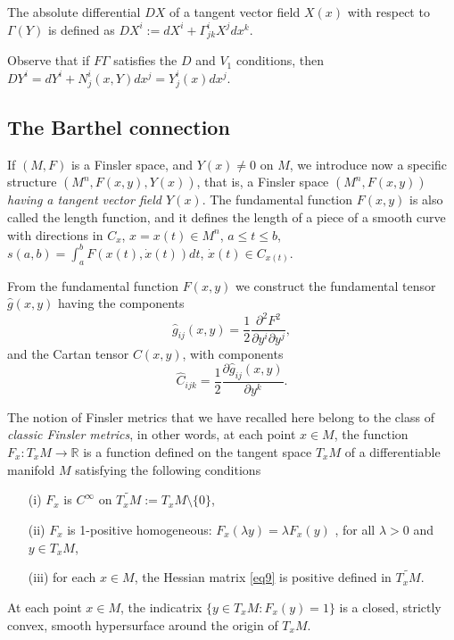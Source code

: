 \documentclass[aps,superscriptaddress, showpacs,preprintnumbers, superscriptaddress, nofootinbibt,twocolumn]{revtex4-2}
\begin{document}
The absolute differential $DX$ of a tangent vector field $X(x)$ with respect
to  $\Gamma (Y)$ is defined as  $DX^{i}:=dX^{i}+\Gamma _{jk}^{i}X^{j}dx^{k}$.

Observe that if $%
F\Gamma $ satisfies the $D$ and $V_{1}$ conditions, then $%
DY^{i}=dY^{i}+N_{j}^{i}\left( x,Y\right) dx^{j}=Y_{j}^{i}(x)dx^{j}$.

\subsection{The Barthel connection}

If $(M,F)$ is a Finsler space, and $Y(x)\neq 0$ on $M$,
we introduce now a specific  structure $(M^n,F(x,y),Y(x))$, that is, a Finsler space %
$(M^n,F(x,y))$ {\it having a tangent vector field $Y(x)$}.
The fundamental function {$F(x,y)$} is also called the length function, and it defines the
length of a piece of a smooth curve with directions in $C_{x}$, $x=x(t)\in
M^{n}$, $a\leq t\leq b$, $s\left( a,b\right) =\int_{a}^{b}F\left( x(t),\dot{x%
}\left( t\right) \right) dt$, $\dot{x}\left( t\right) \in C_{x(t)}$.

From the fundamental function $F(x,y)$ we construct the fundamental tensor $\hat{g%
}(x,y)$ having the components
\begin{equation}\label{eq9}
\hat{g}_{ij}(x,y)=\frac{1}{2}\frac{\partial ^{2}F^{2}}{\partial y^{i}\partial
y^{j}},
\end{equation}
and the Cartan tensor $C(x,y)$, with components
\begin{equation}
\hat{C}_{ijk}=\frac{1}{2}\frac{\partial \hat{g}_{ij}\left( x,y\right) }{\partial
{y}^{k}}.
\end{equation}

The notion of Finsler metrics that we have recalled here belong to the class
of \textit{classic Finsler metrics}, in other words, at each point $x\in M$,
the function $F_x:T_xM\to \mathbb{R} $ is a function defined on the tangent
space $T_xM$ of a differentiable manifold $M$ satisfying the following
conditions
{\it

\begin{enumerate}
\item[(i)] $F_x$ is $C^\infty$ on $\widetilde{T_xM}:=T_xM\setminus\{0\}$,

\item[(ii)] $F_x$ is 1-positive homogeneous: $F_x(\lambda y)=\lambda F_x(y)$%
, for all $\lambda>0$ and $y\in T_xM$,

\item[(iii)] for each $x\in M$, the Hessian matrix \eqref{eq9} is
positive defined in $\widetilde{T_xM}$.
\end{enumerate}
}
At each point $x\in M$, the indicatrix $\{y\in T_xM:F_x(y)=1\}$ is a closed,
strictly convex, smooth hypersurface around the origin of $T_xM$.
\end{document}
